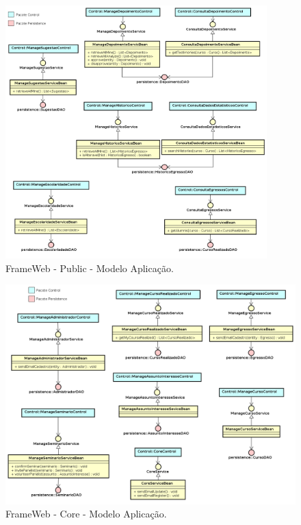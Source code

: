 \begin{figure}[h]
	\centering
	\includegraphics[width=0.9\textwidth]{figuras/projeto/fig-projeto-public-modelo-aplicacao}
	\caption{FrameWeb - Public - Modelo Aplicação.}
	\label{fig-projeto-public-modelo-aplicacao}
\end{figure}


\begin{figure}[h]
	\centering
	\includegraphics[width=1\textwidth]{figuras/projeto/fig-projeto-core-modelo-aplicacao}
	\caption{FrameWeb - Core - Modelo Aplicação.}
	\label{fig-projeto-core-modelo-aplicacao}
\end{figure}



